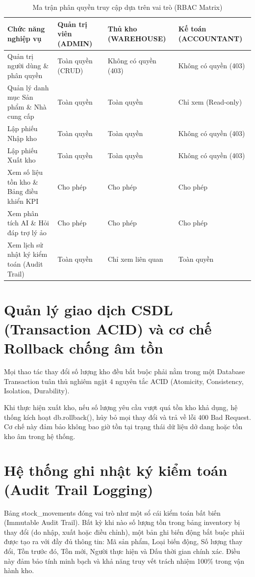 \begin{table}[h!]
\centering
\caption{Ma trận phân quyền truy cập dựa trên vai trò (RBAC Matrix)}
\begin{tabular}{|l|l|l|l|}
\hline
\rowcolor{tablehead}
\textbf{Chức năng nghiệp vụ} & \textbf{Quản trị viên (ADMIN)} & \textbf{Thủ kho (WAREHOUSE)} & \textbf{Kế toán (ACCOUNTANT)} \\ \hline
Quản trị người dùng \& phân quyền & Toàn quyền (CRUD) & Không có quyền (403) & Không có quyền (403) \\ \hline
Quản lý danh mục Sản phẩm \& Nhà cung cấp & Toàn quyền & Toàn quyền & Chỉ xem (Read-only) \\ \hline
Lập phiếu Nhập kho & Toàn quyền & Toàn quyền & Không có quyền (403) \\ \hline
Lập phiếu Xuất kho & Toàn quyền & Toàn quyền & Không có quyền (403) \\ \hline
Xem số liệu tồn kho \& Bảng điều khiển KPI & Cho phép & Cho phép & Cho phép \\ \hline
Xem phân tích AI \& Hỏi đáp trợ lý ảo & Cho phép & Cho phép & Cho phép \\ \hline
Xem lịch sử nhật ký kiểm toán (Audit Trail) & Toàn quyền & Chỉ xem liên quan & Toàn quyền \\ \hline
\end{tabular}
\end{table}

\section{Quản lý giao dịch CSDL (Transaction ACID) và cơ chế Rollback chống âm tồn}

Mọi thao tác thay đổi số lượng kho đều bắt buộc phải nằm trong một Database Transaction tuân thủ nghiêm ngặt 4 nguyên tắc ACID (Atomicity, Consistency, Isolation, Durability).

Khi thực hiện xuất kho, nếu số lượng yêu cầu vượt quá tồn kho khả dụng, hệ thống kích hoạt db.rollback(), hủy bỏ mọi thay đổi và trả về lỗi 400 Bad Request. Cơ chế này đảm bảo không bao giờ tồn tại trạng thái dữ liệu dở dang hoặc tồn kho âm trong hệ thống.

\section{Hệ thống ghi nhật ký kiểm toán (Audit Trail Logging)}

Bảng stock\_movements đóng vai trò như một sổ cái kiểm toán bất biến (Immutable Audit Trail). Bất kỳ khi nào số lượng tồn trong bảng inventory bị thay đổi (do nhập, xuất hoặc điều chỉnh), một bản ghi biến động bắt buộc phải được tạo ra với đầy đủ thông tin: Mã sản phẩm, Loại biến động, Số lượng thay đổi, Tồn trước đó, Tồn mới, Người thực hiện và Dấu thời gian chính xác. Điều này đảm bảo tính minh bạch và khả năng truy vết trách nhiệm 100\% trong vận hành kho.


